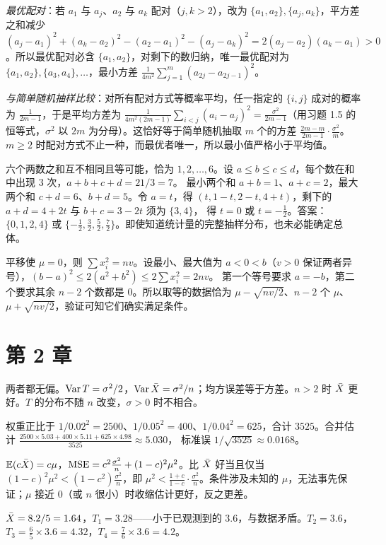 \emph{最优配对}：若 $a_1$ 与 $a_j$、$a_2$ 与 $a_k$ 配对（$j,k>2$），改为 $\{a_1,a_2\},\{a_j,a_k\}$，平方差之和减少
$(a_j-a_1)^2+(a_k-a_2)^2-(a_2-a_1)^2-(a_j-a_k)^2=2(a_j-a_2)(a_k-a_1)>0$。所以最优配对必含 $\{a_1,a_2\}$，对剩下的数归纳，唯一最优配对为
$\{a_1,a_2\},\{a_3,a_4\},\dots$，最小方差 $\frac{1}{4m^2}\sum_{j=1}^m(a_{2j}-a_{2j-1})^2$。

\emph{与简单随机抽样比较}：对所有配对方式等概率平均，任一指定的 $\{i,j\}$ 成对的概率为 $\frac1{2m-1}$，于是平均方差为
$\frac{1}{4m^2(2m-1)}\sum_{i<j}(a_i-a_j)^2=\frac{\sigma^2}{2m-1}$（用习题 1.5 的恒等式，$\sigma^2$ 以 $2m$ 为分母）。这恰好等于简单随机抽取 $m$ 个的方差
$\frac{2m-m}{2m-1}\cdot\frac{\sigma^2}{m}$。$m\ge2$ 时配对方式不止一种，而最优者唯一，所以最小值严格小于平均值。

六个两数之和互不相同且等可能，恰为 $1,2,\dots,6$。设 $a\le b\le c\le d$，每个数在和中出现 3 次，$a+b+c+d=21/3=7$。
最小两个和 $a+b=1$、$a+c=2$，最大两个和 $c+d=6$、$b+d=5$。令 $a=t$，得 $(t,1-t,2-t,4+t)$，剩下的 $a+d=4+2t$ 与 $b+c=3-2t$ 须为 $\{3,4\}$，
得 $t=0$ 或 $t=-\frac12$。答案：$\{0,1,2,4\}$ 或 $\{-\frac12,\frac32,\frac52,\frac72\}$。即使知道统计量的完整抽样分布，也未必能确定总体。

平移使 $\mu=0$，则 $\sum x_i^2=nv$。设最小、最大值为 $a<0<b$（$v>0$ 保证两者异号），$(b-a)^2\le2(a^2+b^2)\le2\sum x_i^2=2nv$。
第一个等号要求 $a=-b$，第二个要求其余 $n-2$ 个数都是 $0$。所以取等的数据恰为 $\mu-\sqrt{nv/2}$、$n-2$ 个 $\mu$、$\mu+\sqrt{nv/2}$，验证可知它们确实满足条件。

\section*{第 2 章}

两者都无偏。$\operatorname{Var} T=\sigma^2/2$，$\operatorname{Var}\bar{X}=\sigma^2/n$；均方误差等于方差。$n>2$ 时 $\bar{X}$ 更好。$T$ 的分布不随 $n$ 改变，$\sigma>0$ 时不相合。

权重正比于 $1/0.02^2=2500$、$1/0.05^2=400$、$1/0.04^2=625$，合计 $3525$。合并估计 $\frac{2500\times5.03+400\times5.11+625\times4.98}{3525}\approx5.030$，
标准误 $1/\sqrt{3525}\approx0.0168$。

$\mathbb{E}(c\bar{X})=c\mu$，$\operatorname{MSE}=c^2\frac{\sigma^2}n+(1-c)^2\mu^2$。比 $\bar{X}$ 好当且仅当 $(1-c)^2\mu^2<(1-c^2)\frac{\sigma^2}n$，即
$\mu^2<\frac{1+c}{1-c}\cdot\frac{\sigma^2}n$。条件涉及未知的 $\mu$，无法事先保证；$\mu$ 接近 $0$（或 $n$ 很小）时收缩估计更好，反之更差。

$\bar{X}=8.2/5=1.64$，$T_1=3.28$——小于已观测到的 $3.6$，与数据矛盾。$T_2=3.6$，$T_3=\frac65\times3.6=4.32$，$T_4=\frac76\times3.6=4.2$。

